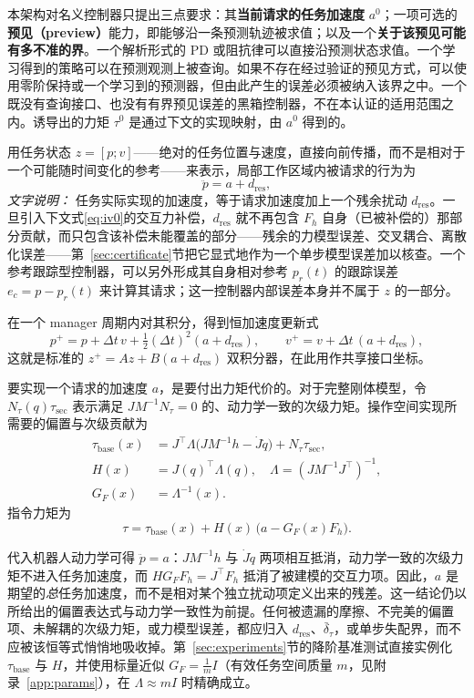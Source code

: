\documentclass[journal]{IEEEtran}
\begin{document}
本架构对名义控制器只提出三点要求：其\textbf{当前请求的任务加速度} $a^0$；一项可选的\textbf{预见（preview）}能力，即能够沿一条预测轨迹被求值；以及一个\textbf{关于该预见可能有多不准的界}。一个解析形式的 PD 或阻抗律可以直接沿预测状态求值。一个学习得到的策略可以在预测观测上被查询。如果不存在经过验证的预见方式，可以使用零阶保持或一个学习到的预测器，但由此产生的误差必须被纳入该界之中。一个既没有查询接口、也没有有界预见误差的黑箱控制器，不在本认证的适用范围之内。诱导出的力矩 $\tau^0$ 是通过下文的实现映射，由 $a^0$ 得到的。

用任务状态 $z=[p;v]$——绝对的任务位置与速度，直接向前传播，而不是相对于一个可能随时间变化的参考——来表示，局部工作区域内被请求的行为为
\[
\ddot p=a+d_{\mathrm{res}},
\]
\emph{文字说明：} 任务实际实现的加速度，等于请求加速度加上一个残余扰动 $d_{\mathrm{res}}$。一旦引入下文式\eqref{eq:iv0}的交互力补偿，$d_{\mathrm{res}}$ 就不再包含 $F_h$ 自身（已被补偿的）那部分贡献，而只包含该补偿未能覆盖的部分——残余的力模型误差、交叉耦合、离散化误差——第~\ref{sec:certificate}节把它显式地作为一个单步模型误差加以核查。一个参考跟踪型控制器，可以另外形成其自身相对参考 $p_r(t)$ 的跟踪误差 $e_c=p-p_r(t)$ 来计算其请求；这一控制器内部误差本身并不属于 $z$ 的一部分。

在一个 manager 周期内对其积分，得到恒加速度更新式
\[
p^{+}=p+\Delta t\,v+\tfrac12(\Delta t)^2(a+d_{\mathrm{res}}),
\qquad
v^{+}=v+\Delta t\,(a+d_{\mathrm{res}}),
\]
这就是标准的 $z^{+}=Az+B(a+d_{\mathrm{res}})$ 双积分器，在此用作共享接口坐标。

要实现一个请求的加速度 $a$，是要付出力矩代价的。对于完整刚体模型，令 $N_\tau(q)\tau_{\mathrm{sec}}$ 表示满足 $JM^{-1}N_\tau=0$ 的、动力学一致的次级力矩。操作空间实现所需要的偏置与次级贡献为
\begin{align}
\tau_{\mathrm{base}}(x)
&=J^\top\Lambda\bigl(JM^{-1}h-\dot J\dot q\bigr)
+N_\tau\tau_{\mathrm{sec}}, \nonumber\\
H(x)&=J(q)^\top\Lambda(q),
\quad
\Lambda=\left(JM^{-1}J^\top\right)^{-1}, \nonumber\\
G_F(x)&=\Lambda^{-1}(x).
\label{eq:iv0}
\end{align}
指令力矩为
\begin{equation}
\tau=\tau_{\mathrm{base}}(x)+H(x)\,\bigl(a-G_F(x)F_h\bigr).
\label{eq:iv0a}
\end{equation}

代入机器人动力学可得 $\ddot p=a$：$JM^{-1}h$ 与 $\dot J\dot q$ 两项相互抵消，动力学一致的次级力矩不进入任务加速度，而 $HG_FF_h=J^\top F_h$ 抵消了被建模的交互力项。因此，$a$ 是期望的\emph{总}任务加速度，而不是相对某个独立扰动项定义出来的残差。这一结论仍以所给出的偏置表达式与动力学一致性为前提。任何被遗漏的摩擦、不完美的偏置项、未解耦的次级力矩，或力模型误差，都应归入 $d_{\mathrm{res}}$、$\bar\delta_\tau$，或单步失配界，而不应被该恒等式悄悄地吸收掉。第~\ref{sec:experiments}节的降阶基准测试直接实例化 $\tau_{\mathrm{base}}$ 与 $H$，并使用标量近似 $G_F=\tfrac1m I$（有效任务空间质量 $m$，见附录~\ref{app:params}），在 $\Lambda\approx mI$ 时精确成立。
\end{document}
